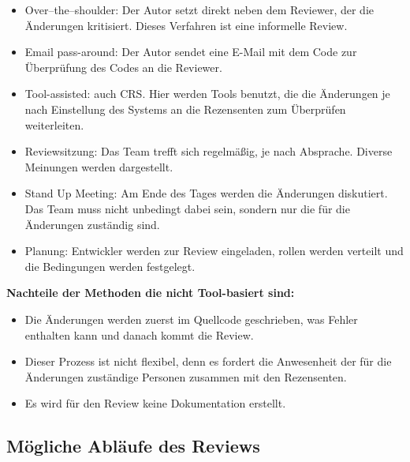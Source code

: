\begin{itemize}
	\item Over–the–shoulder: Der Autor setzt direkt neben dem Reviewer, der die Änderungen kritisiert. Dieses Verfahren ist eine informelle Review.
	\item Email pass-around: Der Autor sendet eine E-Mail mit dem Code zur Überprüfung des Codes an die Reviewer.
	\item Tool-assisted: auch \ac{CRS}. Hier werden Tools benutzt, die die Änderungen je nach Einstellung des Systems an die Rezensenten zum Überprüfen weiterleiten.
	\item Reviewsitzung: Das Team trefft sich regelmäßig, je nach Absprache. Diverse Meinungen werden dargestellt.
	\item Stand Up Meeting: Am Ende des Tages werden die Änderungen diskutiert. Das Team muss nicht unbedingt dabei sein, sondern nur die für die Änderungen zuständig sind.
	\item Planung: Entwickler werden zur Review eingeladen, rollen werden verteilt und die Bedingungen werden festgelegt.
\end{itemize}

\textbf{Nachteile der Methoden die nicht Tool-basiert sind:}
\begin{itemize}
	\item Die Änderungen werden zuerst im Quellcode geschrieben, was Fehler enthalten kann und danach kommt die Review.
	\item Dieser Prozess ist nicht flexibel, denn es fordert die Anwesenheit der für die Änderungen zuständige Personen zusammen mit den Rezensenten.
	\item Es wird für den Review keine Dokumentation erstellt.
\end{itemize}

\subsection{Mögliche Abläufe des Reviews}
\label{sec:review abläufe}

